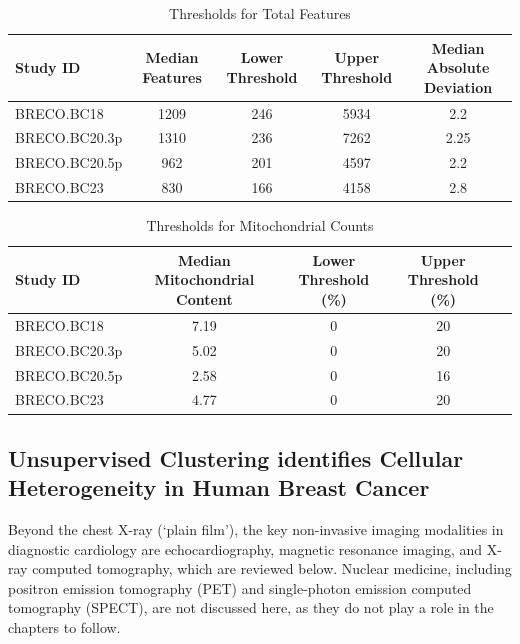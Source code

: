 \begin{table}[ht]
	\centering
	\small
	\renewcommand{\arraystretch}{1.4}
	\begin{tabular}{| l | c | c | c | c |}
		\hline
		Study ID	&	Median Features & Lower Threshold & Upper Threshold & Median Absolute Deviation \\
		\hline
		BRECO.BC18 		& 1209 & 246 & 5934 & 2.2 	\\
		BRECO.BC20.3p 	& 1310 & 236 & 7262 & 2.25	\\
		BRECO.BC20.5p 	& 962  & 201 & 4597 & 2.2 	\\
		BRECO.BC23 		& 830  & 166 & 4158 & 2.8	\\
		\hline
	\end{tabular}
	\caption{Thresholds for Total Features}
	\label{tab: qc_thesholds_features}
\end{table}

\begin{table}
	\centering
	\small
	\renewcommand{\arraystretch}{1.4}
	\begin{tabular}{| l | c | c | c | c |}
		\hline
		Study ID & Median Mitochondrial Content & Lower Threshold (\%) & Upper Threshold (\%) \\
		\hline
		BRECO.BC18 		& 7.19 & 0 & 20 \\
		BRECO.BC20.3p 	& 5.02 & 0 & 20 \\
		BRECO.BC20.5p 	& 2.58 & 0 & 16 \\
		BRECO.BC23 		& 4.77 & 0 & 20 \\
		\hline
	\end{tabular}
	\caption{Thresholds for Mitochondrial Counts}
	\label{tab: qc_thesholds_mito_percent}
\end{table}




\subsection{Unsupervised Clustering identifies Cellular Heterogeneity in Human Breast Cancer}
\label{sub:diagnostic}

Beyond the chest X-ray (`plain film'), the key non-invasive imaging modalities in diagnostic cardiology are echocardiography, magnetic resonance imaging, and X-ray computed tomography, which are reviewed below.  Nuclear medicine, including positron emission tomography (PET) and single-photon emission computed tomography (SPECT), are not discussed here, as they do not play a role in the chapters to follow.

